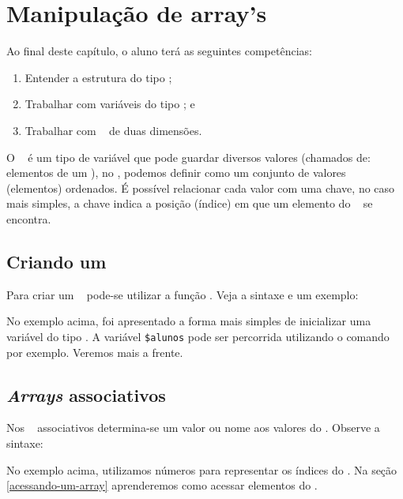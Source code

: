 \chapter{Manipulação de array's}
\label{manipulacao-de-arrays}

Ao final deste capítulo, o aluno terá as seguintes competências:
\begin{enumerate}
    \item Entender a estrutura do tipo \tipoarray;  
    \item Trabalhar com variáveis do tipo \tipoarray; e
    \item Trabalhar com \tipoarrays~ de duas dimensões.
\end{enumerate}

O \tipoarray~ é um tipo de variável que pode guardar diversos valores (chamados de: elementos 
de um \tipoarray), no \php, podemos definir como um conjunto de valores (elementos) ordenados. 
É possível relacionar cada valor com uma chave, no caso mais simples, a chave indica a 
posição (índice) em que um elemento do \tipoarray~ se encontra.

\section{Criando um \comandoarray}
\label{criando-um-array}

Para criar um \tipoarray~ pode-se utilizar a função \comandoarray. Veja a sintaxe e um exemplo:



No exemplo acima, foi apresentado a forma mais simples de inicializar uma variável do 
tipo \tipoarray. A variável \texttt{\$alunos} pode ser percorrida utilizando o comando
\comandofor~ por exemplo. Veremos mais a frente.

\section{\textit{Arrays} associativos}
\label{arrays-associativos}

Nos \tipoarrays~ associativos determina-se um valor ou nome aos valores do \tipoarray.
Observe a sintaxe:



No exemplo acima, utilizamos números para representar os índices do \tipoarray. 
Na seção \ref{acessando-um-array} aprenderemos como acessar elementos do \tipoarray.

